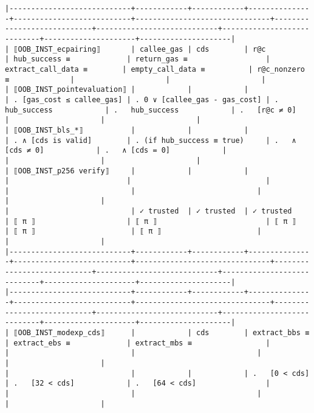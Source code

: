 \documentclass[varwidth=\maxdimen,margin=0.5cm,multi={verbatim}]{standalone}
\begin{document}
\begin{verbatim}
|----------------------------+------------+------------+---------------+---------------------------+-------------------------------+----------------------------+----------------------------+----------------------------+---------------------+---------------------|
| ⟦OOB_INST_ecpairing⟧       | callee_gas | cds        | r@c           | hub_success ≡             | return_gas ≡                  | extract_call_data ≡        | empty_call_data ≡          | r@c_nonzero ≡              |                     |                     |
| ⟦OOB_INST_pointevaluation⟧ |            |            |               | . [gas_cost ≤ callee_gas] | . 0 ∨ [callee_gas - gas_cost] | .   hub_success            | .   hub_success            | .   [r@c ≠ 0]              |                     |                     |
| ⟦OOB_INST_bls_*⟧           |            |            |               | . ∧ [cds is valid]        | . (if hub_success ≡ true)     | .   ∧ [cds ≠ 0]            | .   ∧ [cds = 0]            |                            |                     |                     |
| ⟦OOB_INST_p256 verify⟧     |            |            |               |                           |                               |                            |                            |                            |                     |                     |
|                            | ✓ trusted  | ✓ trusted  | ✓ trusted     | ⟦ π ⟧                     | ⟦ π ⟧                         | ⟦ π ⟧                      | ⟦ π ⟧                      | ⟦ π ⟧                      |                     |                     |
|----------------------------+------------+------------+---------------+---------------------------+-------------------------------+----------------------------+----------------------------+----------------------------+---------------------+---------------------|
|----------------------------+------------+------------+---------------+---------------------------+-------------------------------+----------------------------+----------------------------+----------------------------+---------------------+---------------------|
| ⟦OOB_INST_modexp_cds⟧      |            | cds        | extract_bbs ≡ | extract_ebs ≡             | extract_mbs ≡                 |                            |                            |                            |                     |                     |
|                            |            |            | .   [0 < cds] | .   [32 < cds]            | .   [64 < cds]                |                            |                            |                            |                     |                     |

\end{verbatim}
\end{document}
